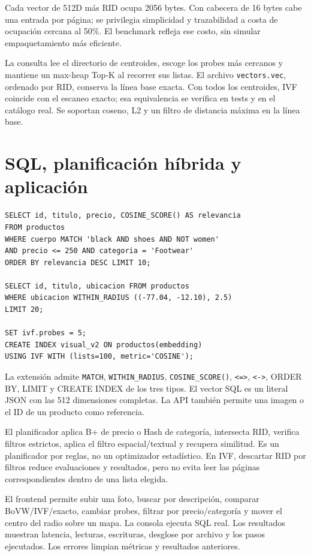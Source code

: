 \documentclass[11pt,a4paper]{article}
\newcommand{\code}[1]{\texttt{#1}}
\begin{document}
Cada vector de 512D más RID ocupa 2056 bytes. Con cabecera de 16 bytes cabe una entrada por página; se privilegia simplicidad y trazabilidad a costa de ocupación cercana al 50\%. El benchmark refleja ese costo, sin simular empaquetamiento más eficiente.

La consulta lee el directorio de centroides, escoge los probes más cercanos y mantiene un max-heap Top-K al recorrer sus listas. El archivo \code{vectors.vec}, ordenado por RID, conserva la línea base exacta. Con todos los centroides, IVF coincide con el escaneo exacto; esa equivalencia se verifica en tests y en el catálogo real. Se soportan coseno, L2 y un filtro de distancia máxima en la línea base.

\newpage
\section{SQL, planificación híbrida y aplicación}\label{sec:sql}
\begin{lstlisting}
SELECT id, titulo, precio, COSINE_SCORE() AS relevancia
FROM productos
WHERE cuerpo MATCH 'black AND shoes AND NOT women'
AND precio <= 250 AND categoria = 'Footwear'
ORDER BY relevancia DESC LIMIT 10;

SELECT id, titulo, ubicacion FROM productos
WHERE ubicacion WITHIN_RADIUS ((-77.04, -12.10), 2.5)
LIMIT 20;

SET ivf.probes = 5;
CREATE INDEX visual_v2 ON productos(embedding)
USING IVF WITH (lists=100, metric='COSINE');
\end{lstlisting}

La extensión admite \code{MATCH}, \code{WITHIN\_RADIUS}, \code{COSINE\_SCORE()}, \code{<=>}, \code{<->}, ORDER BY, LIMIT y CREATE INDEX de los tres tipos. El vector SQL es un literal JSON con las 512 dimensiones completas. La API también permite una imagen o el ID de un producto como referencia.

El planificador aplica B+ de precio o Hash de categoría, intersecta RID, verifica filtros estrictos, aplica el filtro espacial/textual y recupera similitud. Es un planificador por reglas, no un optimizador estadístico. En IVF, descartar RID por filtros reduce evaluaciones y resultados, pero no evita leer las páginas correspondientes dentro de una lista elegida.

El frontend permite subir una foto, buscar por descripción, comparar BoVW/IVF/exacto, cambiar probes, filtrar por precio/categoría y mover el centro del radio sobre un mapa. La consola ejecuta SQL real. Los resultados muestran latencia, lecturas, escrituras, desglose por archivo y los pasos ejecutados. Los errores limpian métricas y resultados anteriores.
\end{document}
